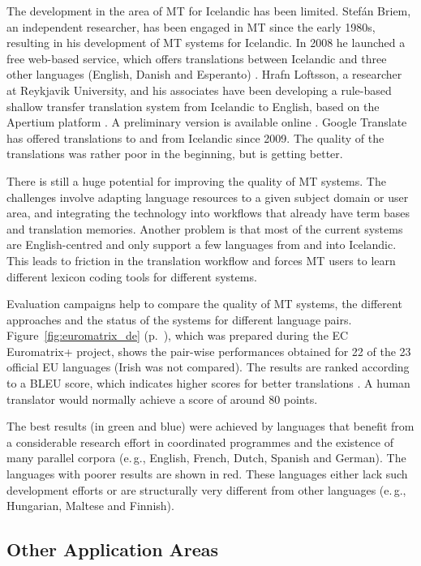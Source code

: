 \documentclass{../../metanetpaper}
\begin{document}
\begin{multicols}{2}
The development in the area of MT for Icelandic has been limited. Stefán Briem, an independent researcher, has been engaged in MT since the early 1980s, resulting in his development of MT systems for Icelandic. In 2008 he launched a free web-based service, which offers translations between Icelandic and three other languages (English, Danish and Esperanto) \cite{tut1}. Hrafn Loftsson, a researcher at Reykjavik University, and his associates have been developing a rule-based shallow transfer translation system from Icelandic to English, based on the Apertium platform \cite{ape1}. A preliminary version is available online \cite{ape2}.  Google Translate has offered translations to and from Icelandic since 2009. The quality of the translations was rather poor in the beginning, but is getting better.

There is still a huge potential for improving the quality of MT systems. The challenges involve adapting language resources to a given subject domain or user area, and integrating the technology into workflows that already have term bases and translation memories. Another problem is that most of the current systems are English-centred and only support a few languages from and into Icelandic. This leads to friction in the translation workflow and forces MT users to learn different lexicon coding tools for different systems.

Evaluation campaigns help to compare the quality of MT systems, the different approaches and the status of the systems for different language pairs. Figure~\ref{fig:euromatrix_de} (p.~\pageref{fig:euromatrix_de}), which was prepared during the EC Euromatrix+ project, shows the pair-wise performances obtained for 22 of the 23 official EU languages (Irish was not compared). The results are ranked according to a BLEU score, which indicates higher scores for better translations \cite{bleu1}. A human translator would normally achieve a score of around 80 points.

The best results (in green and blue) were achieved by languages that benefit from a considerable research effort in coordinated programmes and the existence of many parallel corpora (e.\,g., English, French, Dutch, Spanish and German). The languages with poorer results are shown in red. These languages either lack such development efforts or are structurally very different from other languages (e.\,g., Hungarian, Maltese and Finnish).

\subsection{Other Application Areas}


\end{multicols}
\end{document}
